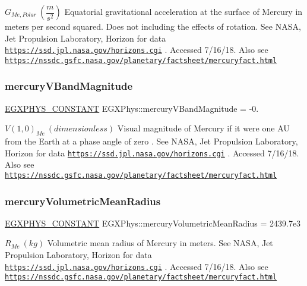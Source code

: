 $ G_{Me,Polar} \ (\dfrac{m}{s^2})$ Equatorial gravitational acceleration at the surface of Mercury in meters per second squared. Does not including the effects of rotation. See N\+A\+SA, Jet Propulsion Laboratory, Horizon for data \href{https://ssd.jpl.nasa.gov/horizons.cgi}{\tt https\+://ssd.\+jpl.\+nasa.\+gov/horizons.\+cgi} . Accessed 7/16/18. Also see \href{https://nssdc.gsfc.nasa.gov/planetary/factsheet/mercuryfact.html}{\tt https\+://nssdc.\+gsfc.\+nasa.\+gov/planetary/factsheet/mercuryfact.\+html} \mbox{\label{group___e_g_x_phys-_constants-_astrophysics-_solar_system-_mercury-_bulk_gab4b0edd36ba34de13b19370f854a8f2c}} 
\subsubsection{\texorpdfstring{mercury\+V\+Band\+Magnitude}{mercuryVBandMagnitude}}
{\footnotesize\ttfamily \mbox{\hyperlink{group___e_g_x_phys-_constants-_macros_ga76980d288494ce1714c9ac68a95ba702}{E\+G\+X\+P\+H\+Y\+S\+\_\+\+C\+O\+N\+S\+T\+A\+NT}} E\+G\+X\+Phys\+::mercury\+V\+Band\+Magnitude = -\/0.}

$ V(1,0)_{Me} \ (dimensionless)$ Visual magnitude of Mercury if it were one AU from the Earth at a phase angle of zero . See N\+A\+SA, Jet Propulsion Laboratory, Horizon for data \href{https://ssd.jpl.nasa.gov/horizons.cgi}{\tt https\+://ssd.\+jpl.\+nasa.\+gov/horizons.\+cgi} . Accessed 7/16/18. Also see \href{https://nssdc.gsfc.nasa.gov/planetary/factsheet/mercuryfact.html}{\tt https\+://nssdc.\+gsfc.\+nasa.\+gov/planetary/factsheet/mercuryfact.\+html} \mbox{\label{group___e_g_x_phys-_constants-_astrophysics-_solar_system-_mercury-_bulk_ga3197bd79c6b461faceffb859933c580f}} 
\subsubsection{\texorpdfstring{mercury\+Volumetric\+Mean\+Radius}{mercuryVolumetricMeanRadius}}
{\footnotesize\ttfamily \mbox{\hyperlink{group___e_g_x_phys-_constants-_macros_ga76980d288494ce1714c9ac68a95ba702}{E\+G\+X\+P\+H\+Y\+S\+\_\+\+C\+O\+N\+S\+T\+A\+NT}} E\+G\+X\+Phys\+::mercury\+Volumetric\+Mean\+Radius = 2439.\+7e3}

$R_{Me} \ (kg)$ Volumetric mean radius of Mercury in meters. See N\+A\+SA, Jet Propulsion Laboratory, Horizon for data \href{https://ssd.jpl.nasa.gov/horizons.cgi}{\tt https\+://ssd.\+jpl.\+nasa.\+gov/horizons.\+cgi} . Accessed 7/16/18. Also see \href{https://nssdc.gsfc.nasa.gov/planetary/factsheet/mercuryfact.html}{\tt https\+://nssdc.\+gsfc.\+nasa.\+gov/planetary/factsheet/mercuryfact.\+html} 